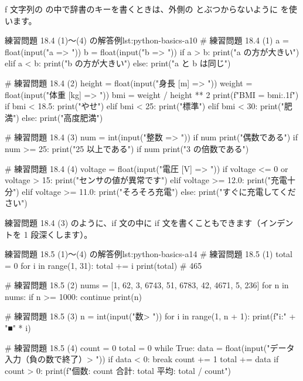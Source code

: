 f 文字列の \cmd{\{ \}} の中で辞書のキーを書くときは、外側の  とぶつからないように  を使います。

\begin{codelisting}[style=python]{練習問題 18.4 (1)〜(4) の解答例}{lst:python-basics-a10}
# 練習問題 18.4 (1)
a = float(input("a => "))
b = float(input("b => "))
if a > b:
    print("a の方が大きい")
elif a < b:
    print("b の方が大きい")
else:
    print("a と b は同じ")

# 練習問題 18.4 (2)
height = float(input("身長 [m] => "))
weight = float(input("体重 [kg] => "))
bmi = weight / height ** 2
print(f"BMI = {bmi:.1f}")
if bmi < 18.5:
    print("やせ")
elif bmi < 25:
    print("標準")
elif bmi < 30:
    print("肥満")
else:
    print("高度肥満")

# 練習問題 18.4 (3)
num = int(input("整数 => "))
if num %
    print("偶数である")
    if num >= 25:
        print("25 以上である")
if num %
    print("3 の倍数である")

# 練習問題 18.4 (4)
voltage = float(input("電圧 [V] => "))
if voltage <= 0 or voltage > 15:
    print("センサの値が異常です")
elif voltage >= 12.0:
    print("充電十分")
elif voltage >= 11.0:
    print("そろそろ充電")
else:
    print("すぐに充電してください")
\end{codelisting}

練習問題 18.4 (3) のように、if 文の中に if 文を書くこともできます（インデントを 1 段深くします）。

\begin{codelisting}[style=python]{練習問題 18.5 (1)〜(4) の解答例}{lst:python-basics-a14}
# 練習問題 18.5 (1)
total = 0
for i in range(1, 31):
    total += i
print(total)   # 465

# 練習問題 18.5 (2)
nums = [1, 62, 3, 6743, 51, 6783, 42, 4671, 5, 236]
for n in nums:
    if n >= 1000:
        continue
    print(n)

# 練習問題 18.5 (3)
n = int(input("数> "))
for i in range(1, n + 1):
    print(f"{i}:" + "■" * i)

# 練習問題 18.5 (4)
count = 0
total = 0
while True:
    data = float(input("データ入力（負の数で終了）> "))
    if data < 0:
        break
    count += 1
    total += data
if count > 0:
    print(f"個数: {count} 合計: {total} 平均: {total / count}")
\end{codelisting}

